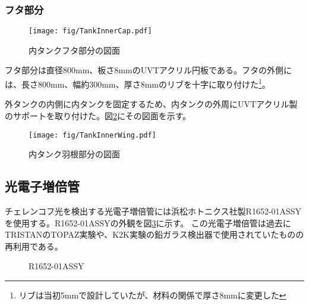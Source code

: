 \documentclass[11pt]{jreport}
\newcommand{\figref}[1]{図\ref{#1}}
\begin{document}
\subsubsection{フタ部分}
\begin{figure}[htbp]
\centering
\texttt{[image: fig/TankInnerCap.pdf]}
\caption[内タンクフタ部分の図面]{内タンクフタ部分の図面}
\label{TankInnerCap}
\end{figure}

フタ部分は直径800mm、板さ8mmのUVTアクリル円板である。フタの外側には、長さ800mm、幅約300mm、厚さ8mmのリブを十字に取り付けた\footnote{リブは当初5mmで設計していたが、材料の関係で厚さ8mmに変更した}。

外タンクの内側に内タンクを固定するため、内タンクの外周にUVTアクリル製のサポートを取り付けた。\figref{TankInnerWing}にその図面を示す。
\begin{figure}[htb]
\centering
\texttt{[image: fig/TankInnerWing.pdf]}
\caption[内タンク羽根部分の図面]{内タンク羽根部分の図面}
\label{TankInnerWing}
\end{figure}
\fi%


\newpage
\subsection{光電子増倍管}
\label{PhotoTube}
チェレンコフ光を検出する光電子増倍管には浜松ホトニクス社製R1652-01ASSYを使用する。R1652-01ASSYの外観を\figref{LGPMT}に示す。
この光電子増倍管は過去にTRISTANのTOPAZ実験や、K2K実験の鉛ガラス検出器で使用されていたものの再利用である。

\begin{figure}[htbp]
  \begin{minipage}{0.47\textwidth}
  \end{minipage}
  \hfill
  \begin{minipage}{0.47\textwidth}
  \end{minipage}
    \caption{R1652-01ASSY}
  \label{LGPMT}
\end{figure}
\end{document}
